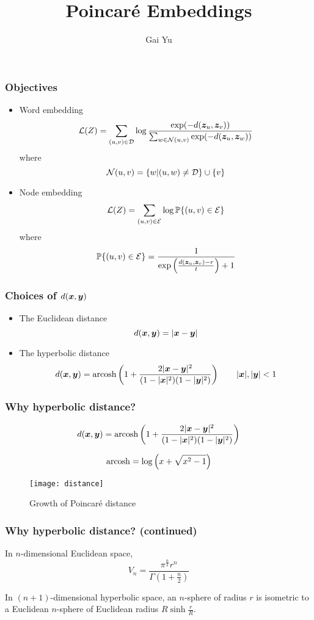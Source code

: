 \documentclass{beamer}
\title{Poincar\'e Embeddings}
\author{Gai Yu}
\begin{document}
\frame{\titlepage}

\begin{frame}

\frametitle{Objectives}

\begin{itemize}
\item Word embedding
\[
{\mathcal L} (Z) = \sum_{(u, v) \in {\mathcal D}} \log \frac{\exp (-d({\bm z}_u, {\bm z}_v))}{\sum_{w \in {\mathcal N} (u, v)} \exp (-d({\bm z}_u, {\bm z}_w))}
\]
where
\[
{\mathcal N} (u, v) = \{w | (u, w) \ne {\mathcal D}\} \cup \{v\}
\]
\item Node embedding
\[
{\mathcal L} (Z) = \sum_{(u, v) \in {\mathcal E}} \log {\mathbb P} \{(u, v) \in {\mathcal E}\}
\]
where
\[
{\mathbb P} \{(u, v) \in {\mathcal E}\} = \frac1{\exp \left(\frac{d({\bm z}_u, {\bm z}_v) - r}t\right) + 1}
\]
\end{itemize}

\end{frame}

\begin{frame}

\frametitle{Choices of $d({\bm x}, {\bm y})$}

\begin{itemize}
\item The Euclidean distance
\[
d({\bm x}, {\bm y}) = |{\bm x} - {\bm y}|
\]
\item The hyperbolic distance
\[
d({\bm x}, {\bm y}) = \operatorname{arcosh} \left(1 + \frac{2 |{\bm x} - {\bm y}|^2}{(1 - |{\bm x}|^2) (1 - |{\bm y}|^2)}\right) \qquad |{\bm x}|, |{\bm y}| < 1
\]
\end{itemize}

\end{frame}

\begin{frame}

\frametitle{Why hyperbolic distance?}

\[
d({\bm x}, {\bm y}) = \operatorname{arcosh} \left(1 + \frac{2 |{\bm x} - {\bm y}|^2}{(1 - |{\bm x}|^2) (1 - |{\bm y}|^2)}\right)
\]

\[
\operatorname{arcosh} = \log \left(x + \sqrt{x^2 - 1}\right)
\]

\begin{figure}
\texttt{[image: distance]}
\caption{Growth of Poincaré distance \cite{nickel2017poincare}}
\end{figure}

\end{frame}

\begin{frame}

\frametitle{Why hyperbolic distance? (continued)}

In $n$-dimensional Euclidean space,
\[
V_n = \frac{\pi^{\frac{n}2} r^n}{\Gamma \left(1 + \frac{n}2\right)}
\]

In $(n + 1)$-dimensional hyperbolic space, an $n$-sphere of radius $r$ is isometric to a Euclidean $n$-sphere of Euclidean radius $R \sinh \frac{r}{R}$.

\end{frame}
\end{document}
